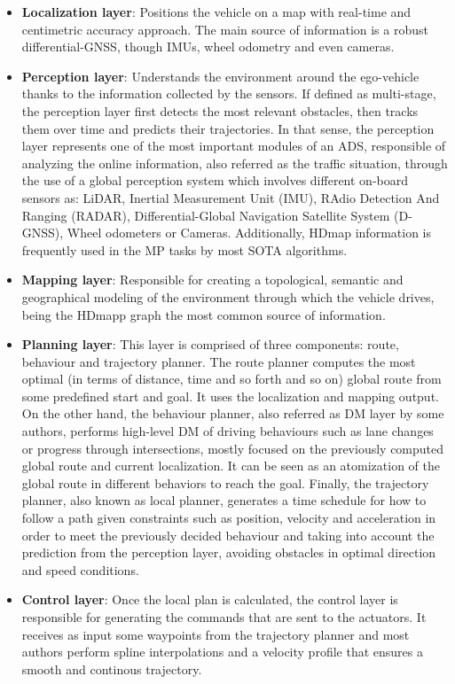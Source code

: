 \begin{itemize}
	
	\item \textbf{Localization layer}: Positions the vehicle on a map with real-time and centimetric accuracy approach. The main source of information is a robust differential-GNSS, though IMUs, wheel odometry and even cameras.
	
	\item \textbf{Perception layer}: Understands the environment around the ego-vehicle thanks to the information collected by the sensors. If defined as multi-stage, the perception layer first detects the most relevant obstacles, then tracks them over time and predicts their trajectories. In that sense, the perception layer represents one of the most important modules of an \ac{ADS}, responsible of analyzing the online information, also referred as the traffic situation, through the use of a global perception system which involves different on-board sensors as: \ac{LiDAR}, Inertial Measurement Unit (IMU), RAdio Detection And Ranging (RADAR), Differential-Global Navigation Satellite System (D-GNSS), Wheel odometers or Cameras. Additionally, \ac{HDmap} information is frequently used in the \ac{MP} tasks by most \ac{SOTA} algorithms.

	\item \textbf{Mapping layer}: Responsible for creating a topological, semantic and geographical modeling of the environment through which the vehicle drives, being the \ac{HDmap}p graph the most common source of information.
	
	\item \textbf{Planning layer}: This layer is comprised of three components: route, behaviour and trajectory planner. The route planner computes the most optimal (in terms of distance, time and so forth and so on) global route from some predefined start and goal. It uses the localization and mapping output. On the other hand, the behaviour planner, also referred as \ac{DM} layer by some authors, performs high-level \ac{DM} of driving behaviours such as lane changes or progress through intersections, mostly focused on the previously computed global route and current localization. It can be seen as an atomization of the global route in different behaviors to reach the goal. Finally, the trajectory planner, also known as local planner, generates a time schedule for how to follow a path given constraints such as position, velocity and acceleration in order to meet the previously decided behaviour and taking into account the prediction from the perception layer, avoiding obstacles in optimal direction and speed conditions.
	
	\item \textbf{Control layer}: Once the local plan is calculated, the control layer is responsible for generating the commands that are sent to the actuators. It receives as input some waypoints from the trajectory planner and most authors perform spline interpolations and a velocity profile that ensures a smooth and continous trajectory. 
	
\end{itemize}

